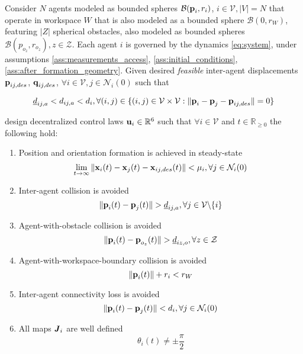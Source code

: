 \begin{bg_box}
\begin{problem}
  Consider $N$ agents modeled as bounded spheres $\mathcal{B}(\bm{\mathbf{p}}_i, r_i)$,
  $i \in \mathcal{V}, |V| = N$ that operate in workspace $W$ that is also modeled
  as a bounded sphere $\mathcal{B}(0,r_W)$, featuring $|Z|$ spherical obstacles,
  also modeled as bounded spheres $\mathcal{B}(p_{o_z}, r_{o_z}), z \in \mathcal{Z}$.
  Each agent $i$ is governed by the dynamics \eqref{eq:system}, under assumptions
  \ref{ass:measurements_access}, \ref{ass:initial_conditions},
  \ref{ass:after_formation_geometry}. Given desired \textit{feasible}
  inter-agent displacements $\bm{\mathbf{p}}_{ij,des}$, $\bm{\mathbf{q}}_{ij,des}$,
  $\forall i \in \mathcal{V}, j \in \mathcal{N}_i(0)$ such that

  $$\underline{d}_{ij,a} < d_{ij,a} < d_i, \forall (i,j) \in
  \{(i,j) \in \mathcal{V} \times \mathcal{V}:
  \|\bm{\mathbf{p}}_i - \bm{\mathbf{p}}_j - \bm{\mathbf{p}}_{ij,des}\| = 0\}$$

  design decentralized control laws $\bm{\mathbf{u}}_i \in \mathbb{R}^6$ such that
  $\forall i \in \mathcal{V}$ and $t \in \mathbb{R}_{\geq 0}$ the following
  hold:

  \begin{enumerate}

    \item Position and orientation formation is achieved in steady-state
      $$\lim_{t \to \infty} \|\bm{\mathbf{x}}_i(t) - \bm{\mathbf{x}}_j(t) - \bm{\mathbf{x}}_{ij,des}(t)\| < \mu_i,
        \forall j \in \mathcal{N}_i(0)$$

    \item Inter-agent collision is avoided
      $$\|\bm{\mathbf{p}}_i(t) - \bm{\mathbf{p}}_j(t)\| > \underline{d}_{ij,a},
      \forall j \in \mathcal{V} \backslash \{i\}$$

    \item Agent-with-obstacle collision is avoided
      $$\|\bm{\mathbf{p}}_i(t) - \bm{\mathbf{p}}_{o_z}(t)\| > \underline{d}_{iz,o},
      \forall z \in \mathcal{Z}$$

    \item Agent-with-workspace-boundary collision is avoided
      $$\|\bm{\mathbf{p}}_i(t)\| + r_i < r_W$$

    \item Inter-agent connectivity loss is avoided
      $$\|\bm{\mathbf{p}}_i(t) - \bm{\mathbf{p}}_j(t)\| < d_i,
      \forall j \in \mathcal{N}_i(0)$$

    \item All maps $\bm{\mathit{J}}_i$ are well defined
      $$\theta_i(t) \ne \pm \frac{\pi}{2}$$

  \end{enumerate}
\label{problem}
\end{problem}
\end{bg_box}
